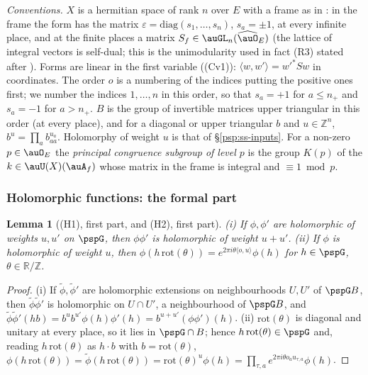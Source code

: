 \documentclass[10pt]{amsart}
\newtheorem{lemma}[theorem]{Lemma}
\theoremstyle{definition}
\theoremstyle{remark}
\newcommand{\R}{\mathbb R}
\newcommand{\Z}{\mathbb Z}
\begin{document}
\emph{Conventions.} $X$ is a hermitian space of rank $n$ over $E$ with a frame as in
{\cite[Definition~3.27]{P53}}: in the frame the form has the matrix $\varepsilon=\mathrm{diag}(s_1,\dots,
s_n)$, $s_a=\pm1$, at every infinite place, and at the finite places a matrix $S_f\in\auGL_n(\widehat
\auO_E)$ (the lattice of integral vectors is self-dual; this is the unimodularity used in fact (R3) stated after
{\cite[Definition~3.27]{P53}}). Forms are linear in the first variable ((Cv1)): $\langle w,w'\rangle=w'^*Sw$ in
coordinates. The order $o$ is a numbering of the indices putting the positive ones first; we number
the indices $1,\dots,n$ in this order, so that $s_a=+1$ for $a\le n_+$ and $s_a=-1$ for $a>n_+$. $B$
is the group of invertible matrices upper triangular in this order (at every place), and for a
diagonal or upper triangular $b$ and $u\in\Z^n$, $b^u=\prod_ab_{aa}^{u_a}$. Holomorphy of weight $u$
is that of \S\ref{psp:ss-inputs}. For a non-zero $p\in\auO_E$ the \emph{principal congruence subgroup
of level $p$} is the group $K(p)$ of the $k\in\auU(X)(\auA_f)$ whose matrix in the frame is integral
and $\equiv1\bmod p$.

\subsubsection{Holomorphic functions: the formal part}\label{psq:ss-H}

\begin{lemma}[(H1), first part, and (H2), first part]\label{psq:H12}
\textup{(i)} If $\phi,\phi'$ are holomorphic of weights $u,u'$ on $\pspG$, then $\phi\phi'$ is
holomorphic of weight $u+u'$. \textup{(ii)} If $\phi$ is holomorphic of weight $u$, then
$\phi(h\,\mathrm{rot}(\theta))=e^{2\pi i\theta\langle o,u\rangle}\phi(h)$ for $h\in\pspG$, $\theta\in\R/\Z$.
\end{lemma}
\begin{proof}
(i) If $\tilde\phi,\tilde\phi'$ are holomorphic extensions on neighbourhoods $U,U'$ of $\pspG B$, then
$\tilde\phi\tilde\phi'$ is holomorphic on $U\cap U'$, a neighbourhood of $\pspG B$, and
$\tilde\phi\tilde\phi'(hb)=b^ub^{u'}\phi(h)\phi'(h)=b^{u+u'}(\phi\phi')(h)$. (ii) $\mathrm{rot}(\theta)$ is
diagonal and unitary at every place, so it lies in $\pspG\cap B$; hence $h\,\mathrm{rot}(\theta)\in\pspG$
and, reading $h\,\mathrm{rot}(\theta)$ as $h\cdot b$ with $b=\mathrm{rot}(\theta)$,
$\phi(h\,\mathrm{rot}(\theta))=\tilde\phi(h\,\mathrm{rot}(\theta))=\mathrm{rot}(\theta)^u\phi(h)
=\prod_{\tau,a}e^{2\pi i\theta o_au_{\tau,a}}\phi(h)$.
\end{proof}
\end{document}
